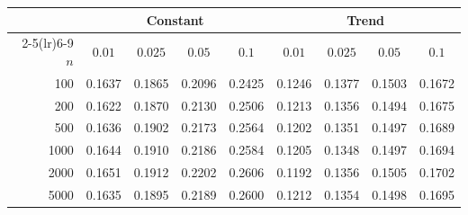 \begin{tabular}{rcccccccc}
\toprule
& \multicolumn{4}{c}{Constant} & \multicolumn{4}{c}{Trend}\\
\cmidrule(lr){2-5}\cmidrule(lr){6-9}
$n$ & $0.01$ & $0.025$ & $0.05$ & $0.1$ & $0.01$ & $0.025$ & $0.05$ & $0.1$\\
\midrule
100 & 0.1637 & 0.1865 & 0.2096 & 0.2425 & 0.1246 & 0.1377 & 0.1503 & 0.1672 \\
200 & 0.1622 & 0.1870 & 0.2130 & 0.2506 & 0.1213 & 0.1356 & 0.1494 & 0.1675 \\
500 & 0.1636 & 0.1902 & 0.2173 & 0.2564 & 0.1202 & 0.1351 & 0.1497 & 0.1689 \\
1000 & 0.1644 & 0.1910 & 0.2186 & 0.2584 & 0.1205 & 0.1348 & 0.1497 & 0.1694 \\
2000 & 0.1651 & 0.1912 & 0.2202 & 0.2606 & 0.1192 & 0.1356 & 0.1505 & 0.1702 \\
5000 & 0.1635 & 0.1895 & 0.2189 & 0.2600 & 0.1212 & 0.1354 & 0.1498 & 0.1695 \\
\bottomrule
\end{tabular}
